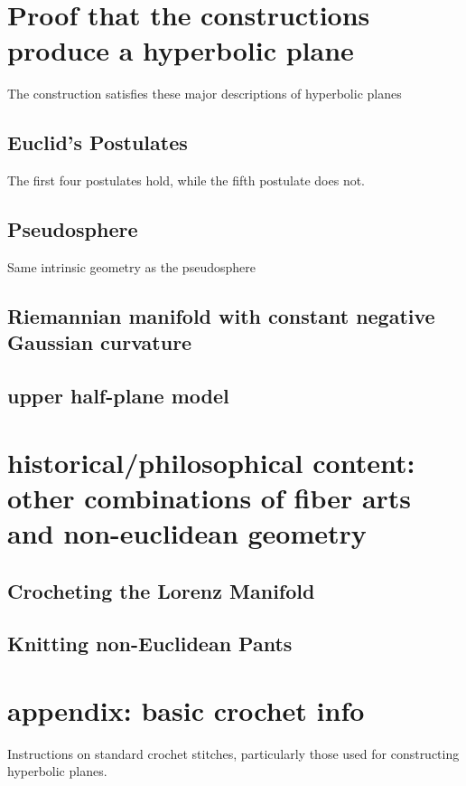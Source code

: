 \documentclass[letterpaper,titlepage]{article}
\begin{document}
\section{Proof that the constructions produce a hyperbolic plane}
The construction satisfies these major descriptions of hyperbolic planes
\subsection{Euclid's Postulates}
The first four postulates hold, while the fifth postulate does not.
\subsection{Pseudosphere}
Same intrinsic geometry as the pseudosphere
\subsection{Riemannian manifold with constant negative Gaussian curvature}
\subsection{upper half-plane model}

\section{historical/philosophical content: other combinations of fiber arts and non-euclidean geometry}
\subsection{Crocheting the Lorenz Manifold \cite{crochetlorenz}}
\subsection{Knitting non-Euclidean Pants \cite{makingmath}}

\section{appendix: basic crochet info}
Instructions on standard crochet stitches, particularly those used for constructing hyperbolic planes. \cite{happyhooker}

\newpage


\end{document}

